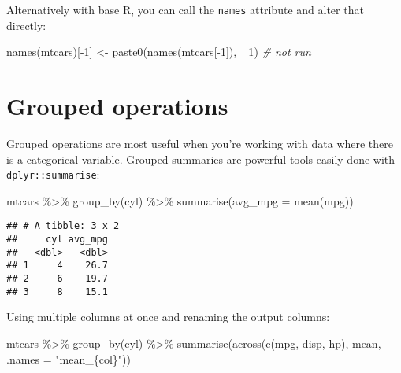 \documentclass[
]{book}
\newenvironment{Shaded}{\begin{snugshade}}{\end{snugshade}}
\newcommand{\AttributeTok}[1]{\textcolor[rgb]{0.77,0.63,0.00}{#1}}
\newcommand{\CommentTok}[1]{\textcolor[rgb]{0.56,0.35,0.01}{\textit{#1}}}
\newcommand{\DecValTok}[1]{\textcolor[rgb]{0.00,0.00,0.81}{#1}}
\newcommand{\FunctionTok}[1]{\textcolor[rgb]{0.00,0.00,0.00}{#1}}
\newcommand{\NormalTok}[1]{#1}
\newcommand{\OtherTok}[1]{\textcolor[rgb]{0.56,0.35,0.01}{#1}}
\newcommand{\SpecialCharTok}[1]{\textcolor[rgb]{0.00,0.00,0.00}{#1}}
\newcommand{\StringTok}[1]{\textcolor[rgb]{0.31,0.60,0.02}{#1}}
\begin{document}
Alternatively with base R, you can call the \texttt{names} attribute and alter that directly:

\begin{Shaded}
\begin{Highlighting}[]
\FunctionTok{names}\NormalTok{(mtcars)[}\SpecialCharTok{{-}}\DecValTok{1}\NormalTok{] }\OtherTok{\textless{}{-}} \FunctionTok{paste0}\NormalTok{(}\FunctionTok{names}\NormalTok{(mtcars[}\SpecialCharTok{{-}}\DecValTok{1}\NormalTok{]), }\StringTok{\textquotesingle{}\_1\textquotesingle{}}\NormalTok{) }\CommentTok{\# not run}
\end{Highlighting}
\end{Shaded}

\hypertarget{grouped-operations}{%
\section{Grouped operations}\label{grouped-operations}}

Grouped operations are most useful when you're working with data where there is a categorical variable. Grouped summaries are powerful tools easily done with \texttt{dplyr::summarise}:

\begin{Shaded}
\begin{Highlighting}[]
\NormalTok{mtcars }\SpecialCharTok{\%\textgreater{}\%} \FunctionTok{group\_by}\NormalTok{(cyl) }\SpecialCharTok{\%\textgreater{}\%} \FunctionTok{summarise}\NormalTok{(}\AttributeTok{avg\_mpg =} \FunctionTok{mean}\NormalTok{(mpg))}
\end{Highlighting}
\end{Shaded}

\begin{verbatim}
## # A tibble: 3 x 2
##     cyl avg_mpg
##   <dbl>   <dbl>
## 1     4    26.7
## 2     6    19.7
## 3     8    15.1
\end{verbatim}

Using multiple columns at once and renaming the output columns:

\begin{Shaded}
\begin{Highlighting}[]
\NormalTok{mtcars }\SpecialCharTok{\%\textgreater{}\%} \FunctionTok{group\_by}\NormalTok{(cyl) }\SpecialCharTok{\%\textgreater{}\%} 
  \FunctionTok{summarise}\NormalTok{(}\FunctionTok{across}\NormalTok{(}\FunctionTok{c}\NormalTok{(mpg, disp, hp), mean, }\AttributeTok{.names =} \StringTok{"mean\_\{col\}"}\NormalTok{))}
\end{Highlighting}
\end{Shaded}
\end{document}
